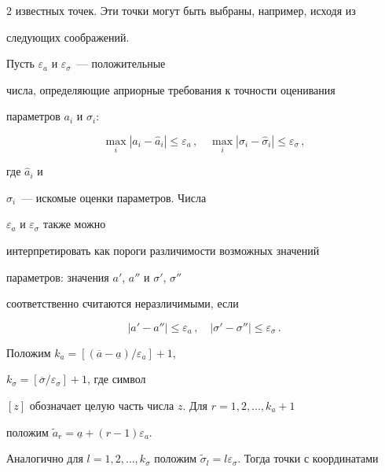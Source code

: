 \begin{multicols}{2}
известных точек. Эти точки могут быть выбраны, например, исходя из


следующих соображений.





Пусть $\varepsilon_a$ и $\varepsilon_{\sigma}$~--- положительные


числа, определяющие априорные требования к точности оценивания


параметров $a_i$ и $\sigma_i$:


\begin{equation}


\max_i|a_i-\widehat a_i|\le


\varepsilon_a\,,\quad \max_i|\sigma_i-\widehat\sigma_i|\le


\varepsilon_{\sigma}\,,


\label{e2k}


\end{equation}


где $\widehat a_i$ и


$\widehat\sigma_i$~--- искомые оценки параметров. Числа


$\varepsilon_a$ и $\varepsilon_{\sigma}$ также можно


интерпретировать как пороги различимости возможных значений


параметров: значения $a'$, $a''$ и $\sigma'$, $\sigma''$


соответственно считаются неразличимыми, если


\begin{equation}


|a'-a''|\le\varepsilon_a\,,\quad  |\sigma'-\sigma''|\le


\varepsilon_{\sigma}\,.


\label{e3k}


\end{equation}





Положим $k_{a}=[(\overline a-\underline a)/\varepsilon_a]+1$,


$k_{\sigma}=[\overline\sigma/\varepsilon_{\sigma}]+1$, где символ


$[z]$ обозначает целую часть числа $z$. Для $r=1,2,\ldots,k_{a}+1$


положим $\widetilde a_r=\underline a+(r-1)\varepsilon_a$.


Аналогично для $l=1,2,\ldots,k_{\sigma}$ положим $\widetilde


\sigma_l=l \varepsilon_{\sigma}$. Тогда точки с координатами



\end{multicols}
